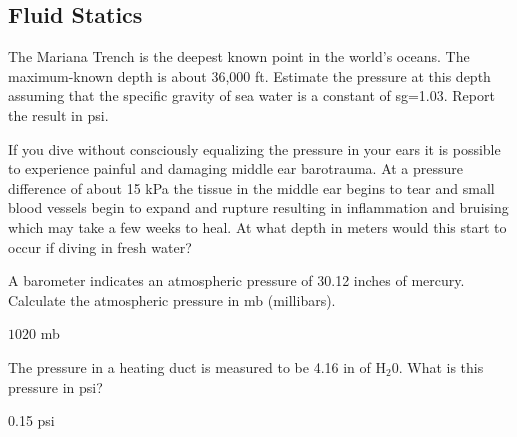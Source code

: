 \documentclass[multi,preview,varwidth=false,border=5,12pt]{standalone}
\begin{document}
\begin{center}
\section*{Fluid Statics}
\end{center}




\begin{question}
The Mariana Trench is the deepest known point in the world's oceans. The maximum-known depth is about 36,000 ft.  Estimate the pressure at this depth assuming that the specific gravity of sea water is a constant of sg=1.03.  Report the result in psi.

\begin{solution}

\end{solution}

\end{question}


\begin{question}
If you dive without consciously equalizing the pressure in your ears it is possible to experience painful and damaging middle ear barotrauma.  At a pressure difference of about 15 kPa the tissue in the middle ear begins to tear and small blood vessels begin to expand and rupture resulting in inflammation and bruising which may take a few weeks to heal.  At what depth in meters would this start to occur if diving in fresh water?

\begin{solution}

\end{solution}

\end{question}


\begin{question}
A barometer indicates an atmospheric pressure of 30.12 inches of mercury.  Calculate the atmospheric pressure in mb (millibars).

\begin{solution}
$1020$ mb
\end{solution}

\end{question}

\begin{question}
The pressure in a heating duct is measured to be 4.16 in of H$_2$0.  What is this pressure in psi?

\begin{solution}
0.15 psi
\end{solution}

\end{question}
\end{document}
